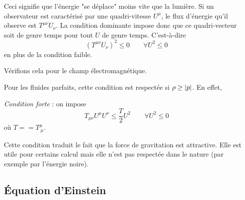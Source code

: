 \documentclass[a4paper,11pt]{report}
\begin{document}
            Ceci signifie que l'énergie "se déplace" moins vite que la lumière. Si un observateur est caractérisé par une quadri-vitesse $U^\mu$, le flux d'énergie qu'il observe est $T^{\mu\nu}U_\nu$. La condition dominante impose donc que ce quadri-vecteur soit de genre temps pour tout $U$ de genre temps. C'est-à-dire
            \begin{equation}
                (T^{\mu\nu}U_\nu)^2\leq0 \qquad\forall U^2\leq0
            \end{equation}
            en plus de la condition faible.
            
            \begin{exmp}
                Vérifions cela pour le champ électromagnétique.
                \comp
            \end{exmp}
            
            \begin{exmp}
                Pour les fluides parfaits, cette condition est respectée si $\rho\geq\abs{p}$. En effet,
                \comp
            \end{exmp}
            
            \begin{defn}
                \textit{Condition forte} : on impose
                \begin{equation}
                    T_{\mu\nu}U^\mu U^\nu \leq \frac{T}{2} U^2\qquad \forall U^2\leq0
                \end{equation}
                où $T = = T^\mu_{~\mu}$.
            \end{defn}
        
            Cette condition traduit le fait que la force de gravitation est attractive. Elle est utile pour certains calcul mais elle n'est pas respectée dans le nature (par exemple par l'énergie noire).

        \subsection{Équation d'Einstein}
        
\end{document}
